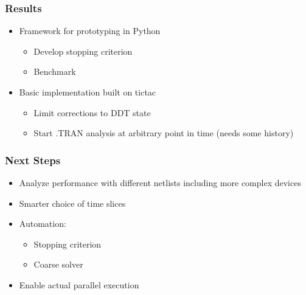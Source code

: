 \begin{frame}
\frametitle{Results}
\begin{itemize}[<+->]
    \item Framework for prototyping in Python
        \begin{itemize}
            \item Develop stopping criterion
            \item Benchmark
        \end{itemize}
    \item Basic implementation built on tictac
        \begin{itemize}
            \item Limit corrections to DDT state
            \item Start .TRAN analysis at arbitrary point in time (needs some history)
        \end{itemize}
\end{itemize}
\end{frame}

\begin{frame}
\frametitle{Next Steps}
\begin{itemize}[<+->]
    \item Analyze performance with different netlists including more complex devices
    \item Smarter choice of time slices
    \item Automation:
        \begin{itemize}
            \item Stopping criterion
            \item Coarse solver
        \end{itemize}
    \item Enable actual parallel execution
\end{itemize}
\end{frame}
